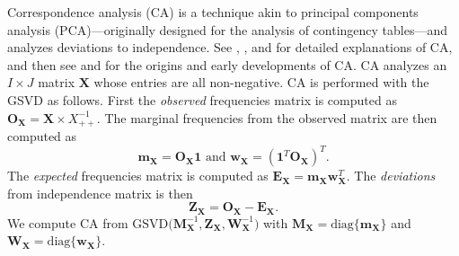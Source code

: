 \documentclass[12pt]{article}
\begin{document}
Correspondence analysis (CA) is a technique akin to principal components
analysis (PCA)---originally designed for the analysis of contingency
tables---and analyzes deviations to independence. See
\citet{greenacre_theory_1984}, \citet{greenacre_correspondence_2010-1},
and \citet{lebart_multivariate_1984} for detailed explanations of CA,
and then see \citet{escofier-cordier_analyse_1965} and
\citet{benzecri_analyse_1973} for the origins and early developments of
CA. CA analyzes an \(I \times J\) matrix \({\mathbf X}\) whose entries
are all non-negative. CA is performed with the GSVD as follows. First
the \emph{observed} frequencies matrix is computed as
\({\mathbf O}_{\mathbf X} = {\mathbf X} \times X_{++}^{-1}\). The
marginal frequencies from the observed matrix are then computed as
\begin{equation}
{\mathbf m}_{\mathbf X} = {\mathbf O}_{\mathbf X}{\mathbf 1} 
\text{ and } 
{\mathbf w}_{\mathbf X} = ({\mathbf 1}^{T}{\mathbf O}_{\mathbf X})^{T}.
\end{equation} The \emph{expected} frequencies matrix is computed as
\({\mathbf E}_{\mathbf X} = {\mathbf m}_{\mathbf X}{\mathbf w}_{\mathbf X}^{T}\).
The \emph{deviations} from independence matrix is then \begin{equation}
{\mathbf Z}_{\mathbf X} 
= {\mathbf O}_{\mathbf X} - {\mathbf E}_{\mathbf X}.
\end{equation} We compute CA from
\(\mathrm{GSVD(} {\mathbf M}_{\mathbf X}^{-1}, {\mathbf Z}_{\mathbf X}, {\mathbf W}_{\mathbf X}^{-1} \mathrm{)}\)
with
\({\mathbf M}_{\mathbf X} = \mathrm{diag\{} {\mathbf m}_{\mathbf X} \mathrm{\}}\)
and
\({\mathbf W}_{\mathbf X} = \mathrm{diag\{} {\mathbf w}_{\mathbf X} \mathrm{\}}\).
\end{document}
